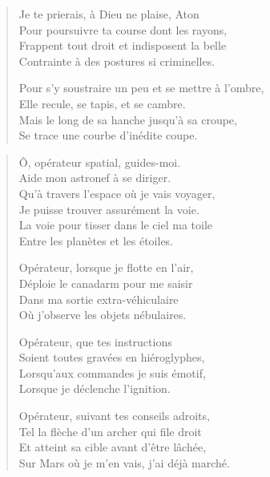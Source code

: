 \begin{verse}
Je te prierais, à Dieu ne plaise, Aton\\
Pour poursuivre ta course dont les rayons,\\
Frappent tout droit et indisposent la belle\\
Contrainte à des postures si criminelles.

Pour s’y soustraire un peu et se mettre à l’ombre,\\
Elle recule, se tapis, et se cambre.\\
Mais le long de sa hanche jusqu’à sa croupe,\\
Se trace une courbe d’inédite coupe.
\end{verse}

\begin{verse}
Ô, opérateur spatial, guides-moi.\\
Aide mon astronef à se diriger.\\
Qu’à travers l’espace où je vais voyager,\\
Je puisse trouver assurément la voie.\\
La voie pour tisser dans le ciel ma toile\\
Entre les planètes et les étoiles.

Opérateur, lorsque je flotte en l’air,\\
Déploie le canadarm pour me saisir\\
Dans ma sortie extra-véhiculaire\\
Où j’observe les objets nébulaires.

Opérateur, que tes instructions\\
Soient toutes gravées en hiéroglyphes,\\
Lorsqu’aux commandes je suis émotif,\\
Lorsque je déclenche l’ignition.

Opérateur, suivant tes conseils adroits,\\
Tel la flèche d’un archer qui file droit\\
Et atteint sa cible avant d’être lâchée,\\
Sur Mars où je m’en vais, j’ai déjà marché.
\end{verse}


